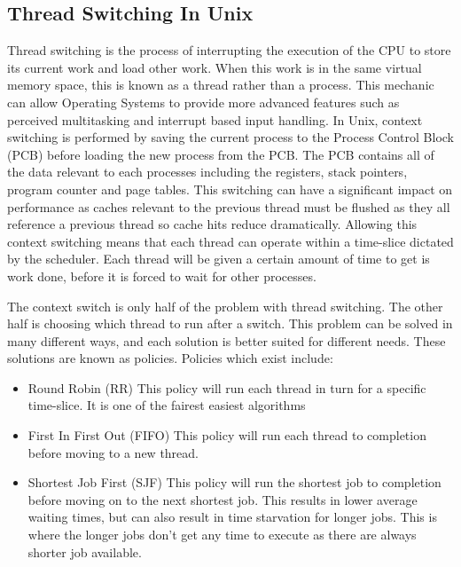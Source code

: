 \subsection{Thread Switching In Unix}
Thread switching is the process of interrupting the execution of the CPU to store its current work and load other work. When this work is in the same virtual memory space, this is known as a thread rather than a process. This mechanic can allow Operating Systems to provide more advanced features such as perceived multitasking and interrupt based input handling. In Unix, context switching is performed by saving the current process to the Process Control Block (PCB) before loading the new process from the PCB. The PCB contains all of the data relevant to each processes including the registers, stack pointers, program counter and page tables. This switching can have a significant impact on performance as caches relevant to the previous thread must be flushed as they all reference a previous thread so cache hits reduce dramatically. Allowing this context switching means that each thread can operate within a time-slice dictated by the scheduler. Each thread will be given a certain amount of time to get is work done, before it is forced to wait for other processes.

The context switch is only half of the problem with thread switching. The other half is choosing which thread to run after a switch. This problem can be solved in many different ways, and each solution is better suited for different needs. These solutions are known as policies. Policies which exist include:

\begin{itemize}
	\item Round Robin (RR)
		  This policy will run each thread in turn for a specific time-slice. It is one of the fairest easiest algorithms
	\item First In First Out (FIFO)
	 	  This policy will run each thread to completion before moving to a new thread. 
	\item Shortest Job First (SJF)
		  This policy will run the shortest job to completion before moving on to the next shortest job. This results in lower average waiting times, but can also result in time starvation for longer jobs. This is where the longer jobs don't get any time to execute as there are always shorter job available. 
\end{itemize}


